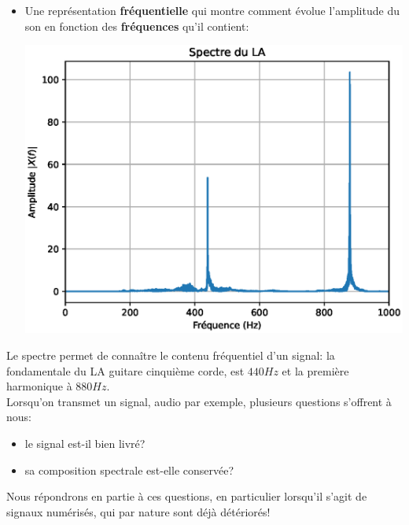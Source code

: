 \documentclass[11pt,a4paper]{article}
\newcounter{ques}
\newcounter{exem}
\begin{document}
\begin{itemize}[label = ]
\begin{minipage}{0.5\linewidth}
\end{minipage}
\item Une représentation \textbf{fréquentielle} qui montre comment évolue l'amplitude du son en fonction des \textbf{fréquences} qu'il contient:\\
\begin{center}
\includegraphics[scale=0.5]{spectre_la.eps} 
\end{center}
\end{itemize}
Le spectre permet de connaître le contenu fréquentiel d'un signal: la fondamentale du LA guitare cinquième corde, est $440Hz$ et la première harmonique à $880Hz$.\\
Lorsqu'on transmet un signal, audio par exemple, plusieurs questions s'offrent à nous:\\
\begin{itemize}[label = ]
\item  le signal est-il bien livré?
\item sa composition spectrale est-elle conservée?

\end{itemize}
Nous répondrons en partie à ces questions, en particulier lorsqu'il s'agit de signaux numérisés, qui par nature sont déjà détériorés!

\newpage
\end{document}
